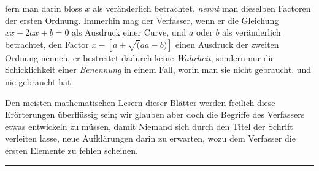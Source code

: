 fern man darin bloss $x$ als veränderlich betrachtet, \textit{nennt} man dieselben Factoren der ersten Ordnung. Immerhin mag der Verfasser, wenn er die Gleichung $xx-2ax+b=0$ als Ausdruck einer Curve, und $a$ oder $b$ als veränderlich betrachtet, den Factor $x-[a+\surd(aa-b)]$ einen Ausdruck der zweiten Ordnung nennen, er bestreitet dadurch keine \textit{Wahrheit}, sondern nur die Schicklichkeit einer \textit{Benennung} in einem Fall, worin man sie nicht gebraucht, und nie gebraucht hat.\par

Den meisten mathematischen Lesern dieser Blätter werden freilich diese Erörterungen überflüssig sein; wir glauben aber doch die Begriffe des Verfassers etwas entwickeln zu müssen, damit Niemand sich durch den Titel der Schrift verleiten lasse, neue Aufklärungen darin zu erwarten, wozu dem Verfasser die ersten Elemente zu fehlen scheinen.\par
\par\noindent\hfill\rule{0.30\linewidth}{0.4pt}\hfill\mbox{}\par

